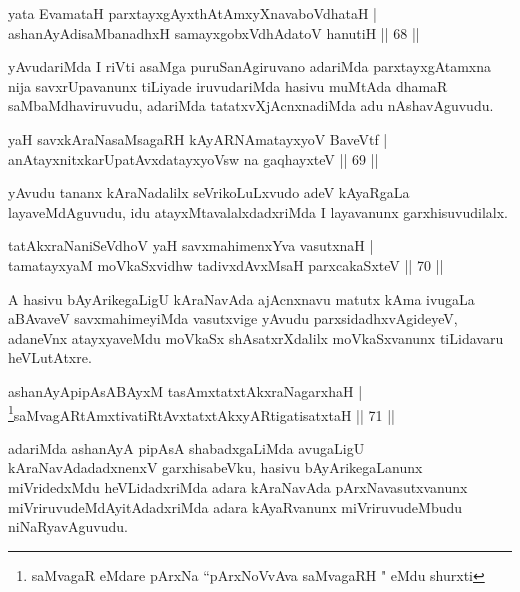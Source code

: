 \begin{shl}
yata EvamataH parxtayxgAyxthAtAmxyXnavaboVdhataH |\\
ashanAyAdisaMbanadhxH samayxgobxVdhAdatoV hanutiH \hfill || 68 ||
\end{shl}

\begin{artha}
yAvudariMda I riVti asaMga puruSanAgiruvano adariMda parxtayxgAtamxna nija savxrUpavanunx tiLiyade iruvudariMda hasivu muMtAda dhamaR saMbaMdhaviruvudu, adariMda tatatxvXjAcnxnadiMda adu nAshavAguvudu.
\end{artha}


\begin{shl}
yaH savxkAraNasaMsagaRH kAyARNAmatayxyoV BaveVtf |\\
anAtayxnitxkarUpatAvxdatayxyoV\s sw na gaqhayxteV \hfill || 69 ||
\end{shl}

\begin{artha}
yAvudu tananx kAraNadalilx seVrikoLuLxvudo adeV kAyaRgaLa layaveMdAguvudu, idu atayxMtavalalxdadxriMda I layavanunx garxhisuvudilalx.
\end{artha}


\begin{shl}
tatAkxraNaniSeVdhoV yaH savxmahimenxYva vasutxnaH |\\
tamatayxyaM moVkaSxvidhw tadivxdAvxMsaH parxcakaSxteV \hfill || 70 ||
\end{shl}

\begin{artha}
A hasivu bAyArikegaLigU kAraNavAda ajAcnxnavu matutx kAma ivugaLa aBAvaveV savxmahimeyiMda vasutxvige yAvudu parxsidadhxvAgideyeV, adaneVnx atayxyaveMdu moVkaSx shAsatxrXdalilx moVkaSxvanunx tiLidavaru heVLutAtxre.
\end{artha}


\begin{shl}
ashanAyApipAsABAyxM tasAmxtatxtAkxraNagarxhaH |\\
\footnote{saMvagaR eMdare pArxNa ``pArxNoVvAva saMvagaRH " eMdu shurxti}saMvagARtAmxtivatiRtAvxtatxtAkxyARtigatisatxtaH \hfill || 71 ||
\end{shl}

\begin{artha}
adariMda ashanAyA pipAsA shabadxgaLiMda avugaLigU kAraNavAdadadxnenxV garxhisabeVku, hasivu bAyArikegaLanunx miVridedxMdu heVLidadxriMda adara kAraNavAda pArxNavasutxvanunx miVriruvudeMdAyitAdadxriMda adara kAyaRvanunx miVriruvudeMbudu niNaRyavAguvudu.
\end{artha}

